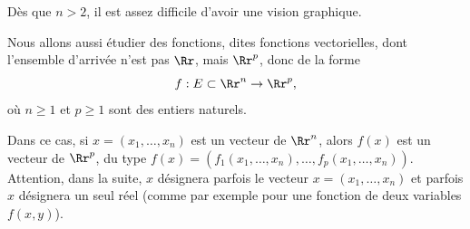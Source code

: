 \documentclass[11pt, class=report,crop=false]{standalone}
\begin{document}
Dès que $n>2$, il est assez difficile d'avoir une vision graphique. 
  
\bigskip

Nous allons aussi étudier des fonctions, dites fonctions vectorielles, dont l'ensemble d'arrivée n'est pas $\Rr$, mais $\Rr^p$, donc de la forme 
\begin{equation*}
f:E \subset \Rr^n \rightarrow \Rr^p,
\end{equation*}
où $n\ge 1$ et $p\ge 1$ sont des entiers naturels. 

Dans ce cas, si $x=(x_1,\ldots,x_n)$ est un vecteur de $\Rr^n$, alors $f(x)$ est un vecteur de $\Rr^p$, du type $f(x)=(f_1(x_1,\ldots,x_n), \ldots,f_p(x_1,\ldots,x_n))$. Attention, dans la suite, $x$ désignera parfois le vecteur $x=(x_1,\ldots,x_n)$ et parfois $x$ désignera un seul réel (comme par exemple pour une fonction de deux variables $f(x,y)$).
\end{document}
